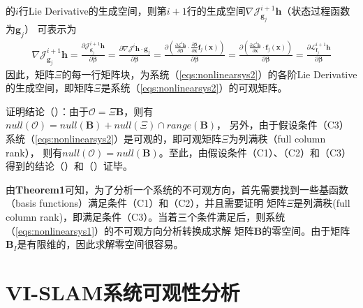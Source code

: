 \documentclass{article}
\begin{document}
的$i$行Lie Derivative的生成空间，则第$i+1$行的生成空间$\nabla\mathcal{J}_{\textbf{g}_j}^{i+1}\textbf{h}$（状态过程函数为$\textbf{g}_j$）
可表示为
\begin{equation}
    \begin{array}{c}
        \nabla\mathcal{J}_{\textbf{g}_j}^{i+1}\textbf{h}=\frac{\partial\mathcal{J}_{\textbf{g}_j}^{i+1}\textbf{h}}{\partial\mathbf{\beta}}
        =\frac{\partial\nabla\mathcal{J}^i\textbf{h}\cdot\textbf{g}_j}{\partial\mathbf{\beta}}
        =\frac{\partial({\frac{\partial\mathcal{L}^i\textbf{h}}{\partial\mathbf{\beta}}}\cdot{{\frac{\partial\mathbf{\beta}}{\partial\textbf{x}}}{\textbf{f}_j}(\textbf{x})})}{\partial\mathbf{\beta}}
        =\frac{\partial({\frac{\partial\mathcal{L}^i\textbf{h}}{\partial{\textbf{x}}}}\cdot{\textbf{f}_j(\textbf{x})})}{\partial\mathbf{\beta}}
        =\frac{\partial\mathcal{L}_{\textbf{f}_j}^{i+1}\textbf{h}}{\partial\mathbf{\beta}}
    \end{array}
\end{equation}
因此，矩阵$\Xi$的每一行矩阵块，为系统（\ref{eqs:nonlinearsys2}）的各阶Lie Derivative的生成空间，即矩阵$\Xi$是系统（\ref{eqs:nonlinearsys2}）的可观矩阵。
\par
证明结论（）：由于$\mathcal{O}=\Xi\textbf{B}$，则有$null(\mathcal{O})=null(\textbf{B})+null(\Xi)\cap{range(\textbf{B})}$\cite{Meyer2000}，
另外，由于假设条件（C3）系统（\ref{eqs:nonlinearsys2}）是可观的，即可观矩阵$\Xi$为列满秩（full column rank），
则有$null(\mathcal{O})=null(\textbf{B})$。至此，由假设条件（C1）、（C2）和（C3）得到的结论（）和（）证毕。
\par
由\textbf{Theorem1}可知，为了分析一个系统的不可观方向，首先需要找到一些基函数（basis functions）满足条件（C1）和（C2），并且需要证明
矩阵$\Xi$是列满秩(full column rank)，即满足条件（C3）。当着三个条件满足后，则系统（\ref{eqs:nonlinearsys1}）的不可观方向分析转换成求解
矩阵$\textbf{B}$的零空间。由于矩阵$\textbf{B}_I$是有限维的，因此求解零空间很容易。

\section{VI-SLAM系统可观性分析}
\end{document}

